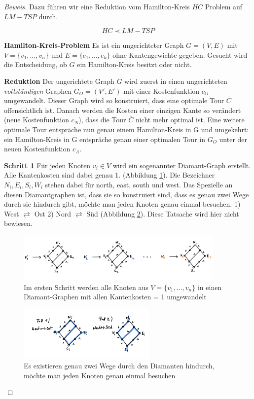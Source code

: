 \documentclass[a4paper,11pt]{scrreprt}
\begin{document}
\begin{proof}[Beweis]
Dazu führen wir eine Reduktion vom Hamilton-Kreis $HC$ Problem auf $LM-TSP$ durch.

\[HC \prec LM-TSP \]

\textbf{Hamilton-Kreis-Problem} Es ist ein ungerichteter Graph $G = (V, E)$ mit $V = \{v_1, \dots, v_n\}$ und $E = \{e_1, \dots, e_k\}$ ohne Kantengewichte gegeben. Gesucht wird die Entscheidung, ob $G$ ein Hamilton-Kreis besitzt oder nicht.

\textbf{Reduktion} Der ungerichtete Graph $G$ wird zuerst in einen ungerichteten \emph{vollständigen} Graphen $G_O = (V', E')$ mit einer Kostenfunktion $c_O$ umgewandelt. Dieser Graph wird so konstruiert, dass eine optimale Tour $\overline{C}$ offensichtlich ist. Danach werden die Kosten einer einzigen Kante so verändert (neue Kostenfunktion $c_N$), dass die Tour $\overline{C}$ nicht mehr optimal ist. Eine weitere optimale Tour entspräche nun genau einem Hamilton-Kreis in G und umgekehrt: ein Hamilton-Kreis in G entspräche genau einer optimalen Tour in $G_O$ unter der neuen Kostenfunktion $c_A$. 

\textbf{Schritt 1} Für jeden Knoten $v_i \in V$ wird ein sogenannter Diamant-Graph erstellt. Alle Kantenkosten sind dabei genau 1. (Abbildung \ref{fig:lm-tsp-proof-step1}). Die Bezeichner ${N_i, E_i, S_i, W_i}$ stehen dabei für north, east, south und west. Das Spezielle an diesen Diamantgraphen ist, dass sie so konstruiert sind, dass es genau zwei Wege durch sie hindurch gibt, möchte man jeden Knoten genau einmal besuchen. 1) West $\rightleftarrows$ Ost 2) Nord $\rightleftarrows$ Süd (Abbildung \ref{fig:lm-tsp-proof-step1-ways}). Diese Tatsache wird hier nicht bewiesen.

\begin{figure}[H]
\centering
\includegraphics[width=0.9\textwidth]{lm_tsp_proof_step1.png}
\caption{Im ersten Schritt werden alle Knoten aus $V = \{v_1, \dots, v_n \}$ in einen Diamant-Graphen mit allen Kantenkosten = 1 umgewandelt}
\label{fig:lm-tsp-proof-step1}
\end{figure}

\begin{figure}[H]
\centering
\includegraphics[width=0.6\textwidth]{lm_tsp_proof_step1_ways.png}
\caption{Es existieren genau zwei Wege durch den Diamanten hindurch, möchte man jeden Knoten genau einmal besuchen}
\label{fig:lm-tsp-proof-step1-ways}
\end{figure}


\end{proof}
\end{document}
